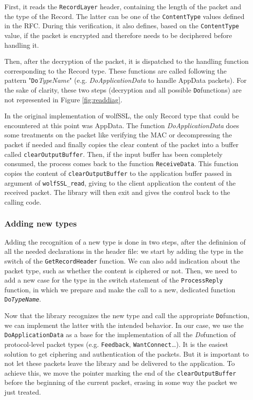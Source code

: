 First, it reads the \texttt{RecordLayer} header, containing the length of the packet and the type of the Record. The latter can be one of the \texttt{ContentType} values defined in the RFC\cite{rfc5246}. During this verification, it also defines, based on the \texttt{ContentType} value, if the packet is encrypted and therefore needs to be deciphered before handling it.

Then, after the decryption of the packet, it is dispatched to the handling function corresponding to the Record type. These functions are called following the pattern "\texttt{Do}\textit{TypeName}" (e.g. \textit{DoApplicationData} to handle AppData packets). For the sake of clarity, these two steps (decryption and all possible \texttt{Do}functions) are not represented in Figure \ref{fig:readdiag}.


In the original implementation of wolfSSL, the only Record type that could be encountered at this point was AppData. The function \textit{DoApplicationData} does some treatments on the packet like verifying the MAC or decompressing the packet if needed and finally copies the clear content of the packet into a buffer called \texttt{clearOutputBuffer}. Then, if the input buffer has been completely consumed, the process comes back to the function \texttt{ReceiveData}. This function copies the content of \texttt{clearOutputBuffer} to the application buffer passed in argument of \texttt{wolfSSL\_read}, giving to the client application the content of the received packet. The library will then exit and gives the control back to the calling code.

\subsubsection{Adding new types}

Adding the recognition of a new type is done in two steps, after the defininion of all the needed declarations in the header file: we start by adding the type in the switch of the \texttt{GetRecordHeader} function. We can also add indication about the packet type, such as whether the content is ciphered or not. Then, we need to add a new case for the type in the switch statement of the \texttt{ProcessReply} function, in which we prepare and make the call to a new, dedicated function \texttt{Do\textit{TypeName}}.

Now that the library recognizes the new type and call the appropriate \texttt{Do}function, we can implement the latter with the intended behavior. In our case, we use the \texttt{DoApplicationData} as a base for the implementation of all the \textit{Do}function of protocol-level packet types (e.g. \texttt{Feedback}, \texttt{WantConnect}\dots). It is the easiest solution to get ciphering and authentication of the packets. But it is important to not let these packets leave the library and be delivered to the application. To achieve this, we move the pointer marking the end of the \texttt{clearOutputBuffer} before the beginning of the current packet, erasing in some way the packet we just treated.

